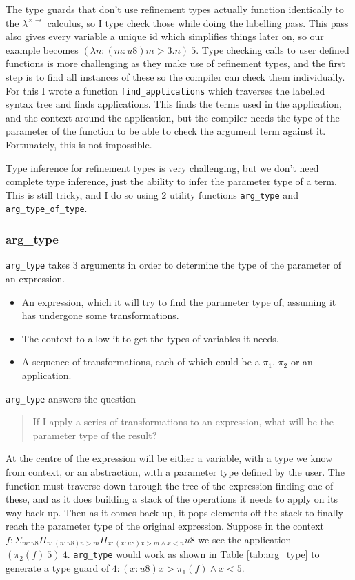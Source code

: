 The type guards that don't use refinement types actually function identically to the
$\lambda^{\times \rightarrow}$ calculus, so I type check those while doing the labelling pass.
This pass also gives every variable a unique id which simplifies things later on, so our example
becomes $(\lambda n: (m: u8) m > 3 . n)\ 5$.
Type checking calls to user defined functions is more challenging as they make use of refinement
types, and the first step is to find all instances of these so the compiler can check them individually.
For this I wrote a function \texttt{find\_applications} which traverses the labelled syntax tree
and finds applications.
This finds the terms used in the application, and the context around the application, but the compiler
needs the type of the parameter of the function to be able to check the argument term against it.
Fortunately, this is not impossible.

Type inference for refinement types is very challenging, but we don't need complete type inference,
just the ability to infer the parameter type of a term.
This is still tricky, and I do so using 2 utility functions \texttt{arg\_type} and \texttt{arg\_type\_of\_type}.

\subsubsection{arg\_type}

\texttt{arg\_type} takes 3 arguments in order to determine the type of the parameter of an expression.

\begin{itemize}
    \item An expression, which it will try to find the parameter type of, assuming it has undergone
    some transformations.
    \item The context to allow it to get the types of variables it needs.
    \item A sequence of transformations, each of which could be a $\pi_1$, $\pi_2$ or an application.
\end{itemize}

\texttt{arg\_type} answers the question

\begin{quote}
    If I apply a series of transformations to an expression, what will be the parameter type of the
    result?
\end{quote}

At the centre of the expression will be either a variable, with a type we know from context, or an
abstraction, with a parameter type defined by the user.
The function must traverse down through the tree of the expression finding one of these, and as it
does building a stack of the operations it needs to apply on its way back up.
Then as it comes back up, it pops elements off the stack to finally reach the parameter type of the
original expression.
Suppose in the context $f: \Sigma_{m:u8} \Pi_{n:(n:u8) n > m} \Pi_{x:(x:u8) x > m \land x < n} u8$
we see the application $(\pi_2(f)\ 5)\ 4$.
\texttt{arg\_type} would work as shown in Table \ref{tab:arg_type} to generate a type guard of
$4: (x: u8) x > \pi_1(f) \land x < 5$.

